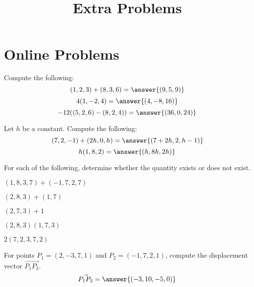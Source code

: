 \documentclass{ximera}
\title{Extra Problems}
\begin{document}
\begin{abstract}
\end{abstract}
\maketitle
\section{Online Problems}
\begin{problem}
Compute the following:
\[
(1,2,3)+(8,3,6)=\answer{(9,5,9)}
\]
\[
4(1,-2,4)=\answer{(4,-8,16)}
\]
\[
-12((5,2,6)-(8,2,4))=\answer{(36,0,24)}
\]
\end{problem}

\begin{problem}
Let $h$ be a constant. Compute the following:
\[
(7,2,-1)+(2h,0,h)=\answer{(7+2h,2,h-1)}
\]
\[
h(1,8,2)=\answer{(h,8h,2h)}
\]
\end{problem}

\begin{problem}
For each of the following, determine whether the quantity exists or does not exist.

$(1,8,3,7)+(-1,7,2,7)$
\begin{multipleChoice}
\end{multipleChoice}

$(2,8,3)+(1,7)$
\begin{multipleChoice}
\end{multipleChoice}

$(2,7,3)+1$
\begin{multipleChoice}
\end{multipleChoice}

$(2,8,3)(1,7,3)$
\begin{multipleChoice}
\end{multipleChoice}

$2(7,2,3,7,2)$
\begin{multipleChoice}
\end{multipleChoice}

\end{problem}

\begin{problem}
For points $P_1=(2,-3,7,1)$ and $P_2=(-1,7,2,1)$, compute the displacement vector $\vec{P_1P_2}$.
\[
\vec{P_1P_2} = \answer{(-3,10,-5,0)}
\]
\end{problem}
\end{document}
